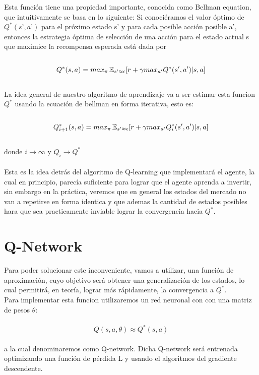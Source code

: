 Esta función tiene una propiedad importante, conocida como Bellman equation, que intuitivamente se basa en lo siguiente: 
Si conociéramos el valor óptimo de $Q^*(s’, a’)$ para el próximo estado s’ y para cada posible acción posible a’, entonces la estrategia óptima de selección de una acción para el estado actual s que maximice la recompensa esperada está dada por
\\\\
\begin{equation}
Q^*(s, a) = max_{\pi} \operatorname{\mathbb{E}}_{s' \approx \epsilon} [ r + \gamma max_{a'} Q^*(s', a')  |  s, a]
\end{equation}
\\
La idea general de nuestro algoritmo de aprendizaje va a ser estimar esta funcion $Q^*$ usando la ecuación de bellman en forma iterativa, esto es:
\\\\
\begin{equation}
Q^*_{i+1}(s, a) = max_{\pi} \operatorname{\mathbb{E}}_{s' \approx \epsilon} [ r + \gamma max_{a'} Q_{i}^*(s', a')  |  s, a]
\end{equation}
\\
donde  $i\rightarrow\infty$ y $Q_i \rightarrow Q^*$
\\\\
Esta es la idea detrás del algoritmo de Q-learning que implementará el agente, la cual en principio, parecía suficiente para lograr que el agente aprenda a invertir, sin embargo en la práctica, veremos que en general los estados del mercado no van a repetirse en forma identica y que ademas la cantidad de estados posibles hara que sea practicamente inviable lograr la convergencia hacia $Q^*$.

\section{Q-Network}
Para poder solucionar este inconveniente, vamos a utilizar, una función de aproximación, cuyo objetivo será obtener una generalización de los estados, lo cual permitirá, en teoría, lograr más rápidamente, la convergencia a $Q^*$.\\
Para implementar esta funcion utilizaremos un red neuronal con con una matriz de pesos $\theta$: 
\\\\
\begin{equation}
Q(s, a, \theta) \approx Q^*(s, a) 
\end{equation}
\\
a la cual denominaremos como Q-network.
Dicha Q-network será entrenada optimizando una función de pérdida L y usando el algoritmos del gradiente descendente.
\\

